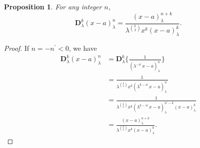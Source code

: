 \documentclass[12pt]{article}
\newcommand{\D}{\mathbf{D}}
\newtheorem{proposition}{Proposition}
\begin{document}
\begin{proposition}
For any integer $n$,
\begin{equation}
    \D_{\lambda}^k(x-a)_{\lambda}^{n}=\frac{(x-a)_{\lambda}^{n+k}}{\lambda^{\binom{k}{2}}x^k(x-a)_{\lambda}^{k}}.
\end{equation}
\end{proposition}
\begin{proof}
If $n=-n^\prime<0$, we have
    \begin{align*}
        \D_{\lambda}^k(x-a)_{\lambda}^{n}&=\D_{\lambda}^k\bigg\{\frac{1}{(\lambda^{-n^\prime}x-a)_{\lambda}^{n^\prime}}\bigg\}\\
        &=\frac{1}{\lambda^{\binom{k}{2}}x^k(\lambda^{k-n^\prime}x-a)_{\lambda}^{n^\prime}}\\
        &=\frac{1}{\lambda^{\binom{k}{2}}x^k(\lambda^{k-n^\prime}x-a)_{\lambda}^{n^\prime-k}(x-a)_{\lambda}^k}\\
        &=\frac{(x-a)_{\lambda}^{n+k}}{\lambda^{\binom{k}{2}}x^k(x-a)_{\lambda}^{k}}.
    \end{align*}
\end{proof}
\end{document}
